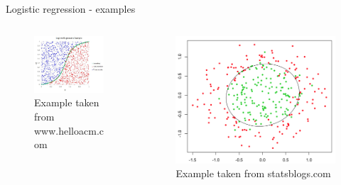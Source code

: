 \documentclass[aspectratio=169]{beamer}
\begin{document}
\begin{frame}{Logistic regression - examples}
    \begin{columns}
    \begin{column}{0.5\textwidth}
        \begin{center}
            \begin{figure}
                \includegraphics[scale=0.4]{./images/logisticRegression01.jpg}
            \caption{Example taken from www.helloacm.com}
            \end{figure}
        \end{center}
    \end{column}
    \begin{column}{0.5\textwidth}  %
        \begin{center}
            \begin{figure}
                \includegraphics[scale=0.13]{./images/logisticRegression02.png}
                \caption{Example taken from statsblogs.com}
            \end{figure}
        \end{center}
    \end{column}
    \end{columns}
\end{frame}
\end{document}
